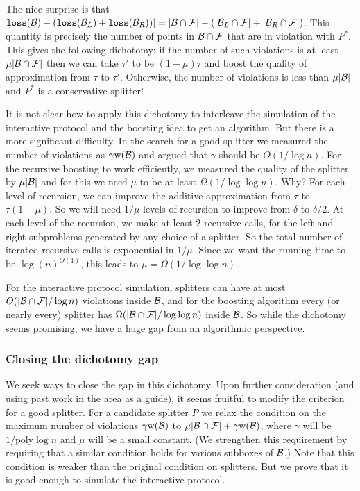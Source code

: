 \documentclass{acmsmall}
\newcommand{\cB}{{\cal B}}
\newcommand{\cF}{{\cal F}}
\newcommand{\cS}{{\cal S}}
\newcommand{\loss}{{\tt loss}}
\newcommand{\poly}{\textrm{poly}}
\newcommand{\width}{{\bf {\rm  w}}}
\begin{document}
The nice surprise is that 
$\loss(\cB)-(\loss(\cB_L)+\loss(\cB_R))|
= |\cB\cap \cF| - (|\cB_L \cap \cF| + |\cB_R\cap \cF|)$. This quantity is precisely the number of
points in $\cB \cap \cF$ that are in violation with $P^*$.  This gives the following dichotomy: if the number of such violations is at least
$\mu |\cB \cap \cF|$ then we can take $\tau'$ to be $(1-\mu)\tau$ and boost the quality of approximation from $\tau$
to $\tau'$. Otherwise, the number of violations is less than $\mu |\cB|$ and $P^*$
is  a conservative splitter!  

It is not clear how to apply this dichotomy to interleave the simulation of the interactive protocol
and the boosting idea to  get an algorithm.
But there is a more significant difficulty.
In the search for a good splitter we measured the number of violations
as $\gamma \width(\cB)$ and argued that $\gamma$ should be $O(1/\log n)$.
For the recursive boosting to
work efficiently, we measured the quality of the splitter by $\mu |\cB|$
and for this we need $\mu$ to be at least $\Omega(1/\log\log n)$.
Why? For each level of recursion, we can improve the 
additive approximation from $\tau$ to $\tau(1-\mu)$.
So we will need $1/\mu$ levels of
recursion to improve from $\delta$ to $\delta/2$.
At each level of the recursion, we make at least $2$
recursive calls, for the left and right subproblems
generated by any choice of a splitter. So the total number of iterated recursive calls
is exponential in $1/\mu$.  Since we want the running time to be $\log(n)^{O(1)}$, this  leads to $\mu = \Omega(1/\log\log n)$.

For the interactive protocol simulation, splitters can have at most
$O(|\cB \cap \cF|/\log n)$ violations inside $\cB$, and for the boosting algorithm
every (or nearly every) splitter has $\Omega(|\cB \cap \cF|/\log\log n)$
inside $\cB$.
So while the dichotomy seems promising, we have
a huge gap from an algorithmic perspective.

\subsubsection*{Closing the dichotomy gap}

We seek ways to close the gap in this dichotomy.
Upon further consideration (and using past work in the area as a guide),
it seems fruitful to modify the criterion for a good splitter.
For a candidate splitter $P$ we relax the condition on the maximum number
of violations $\gamma \width(\cB)$ to $\mu|\cB \cap \cF|+ \gamma \width(\cB)$,
where $\gamma$ will be $1/\poly\log n$ and $\mu$ will be a small constant.
(We strengthen this requirement by requiring that a similar
condition holds for various subboxes of $\cB$.)
Note that this condition is weaker than the original condition on splitters.
But we prove that it is good enough to simulate the
interactive protocol.
\end{document}
